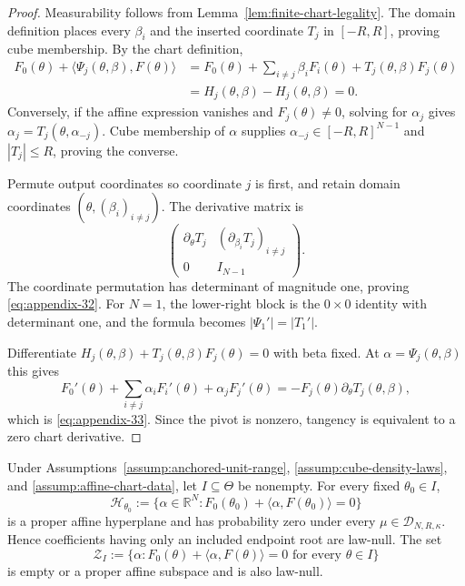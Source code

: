 \begin{proof}
Measurability follows from Lemma~\ref{lem:finite-chart-legality}.  The domain
definition places every $\beta_i$ and the inserted coordinate $T_j$ in
$[-R,R]$, proving cube membership.  By the chart definition,
\[
\begin{aligned}
F_0(\theta)+\langle\Psi_j(\theta,\beta),F(\theta)\rangle
&=F_0(\theta)+\sum_{i\neq j}\beta_iF_i(\theta)
 +T_j(\theta,\beta)F_j(\theta)\\
&=H_j(\theta,\beta)-H_j(\theta,\beta)=0.
\end{aligned}
\]
Conversely, if the affine expression vanishes and $F_j(\theta)\neq0$, solving
for $\alpha_j$ gives $\alpha_j=T_j(\theta,\alpha_{-j})$.  Cube membership of
$\alpha$ supplies $\alpha_{-j}\in[-R,R]^{N-1}$ and $|T_j|\leq R$, proving
the converse.

Permute output coordinates so coordinate $j$ is first, and retain domain
coordinates $(\theta,(\beta_i)_{i\neq j})$.  The derivative matrix is
\[
\begin{pmatrix}
\partial_\theta T_j&(\partial_{\beta_i}T_j)_{i\neq j}\\
0&I_{N-1}
\end{pmatrix}.
\]
The coordinate permutation has determinant of magnitude one, proving \eqref{eq:appendix-32}.
For $N=1$, the lower-right block is the $0\times0$ identity with determinant
one, and the formula becomes $|\Psi_1'|=|T_1'|$.

Differentiate
$H_j(\theta,\beta)+T_j(\theta,\beta)F_j(\theta)=0$ with beta fixed.  At
$\alpha=\Psi_j(\theta,\beta)$ this gives
\[
F_0'(\theta)+\sum_{i\neq j}\alpha_iF_i'(\theta)
 +\alpha_jF_j'(\theta)
=-F_j(\theta)\partial_\theta T_j(\theta,\beta),
\]
which is \eqref{eq:appendix-33}.  Since the pivot is nonzero, tangency is equivalent to a
zero chart derivative.
\end{proof}

\begin{lemma}
\label{lem:affine-null-classes}
Under Assumptions~\ref{assump:anchored-unit-range},
\ref{assump:cube-density-laws}, and
\ref{assump:affine-chart-data}, let $I\subseteq\Theta$ be nonempty.  For
every fixed $\theta_0\in I$,
\[
\mathcal H_{\theta_0}
:=\{\alpha\in\mathbb R^N:
F_0(\theta_0)+\langle\alpha,F(\theta_0)\rangle=0\}
\]
is a proper affine hyperplane and has probability zero under every
$\mu\in\mathcal D_{N,R,\kappa}$.  Hence coefficients having only an included
endpoint root are law-null.  The set
\[
\mathcal Z_I:=\{\alpha:F_0(\theta)+\langle\alpha,F(\theta)\rangle=0
                 \text{ for every }\theta\in I\}
\]
is empty or a proper affine subspace and is also law-null.
\end{lemma}

